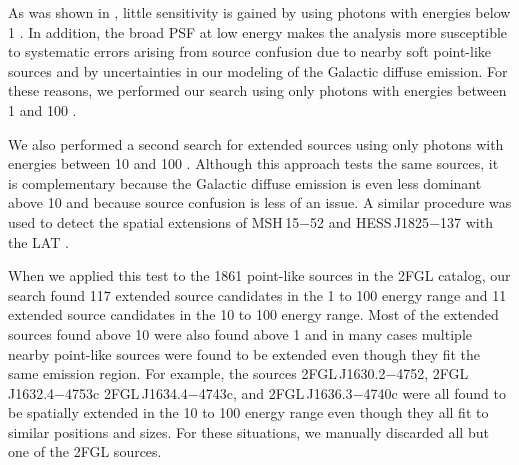 As was shown in , little sensitivity is gained by
using photons with energies below 1 \gev. In addition,
the broad PSF at low energy makes the analysis more susceptible to systematic
errors arising from source confusion due to nearby soft point-like sources
and by uncertainties in our modeling of the Galactic diffuse emission. 
For these reasons,
we performed our search using only photons with energies between 1 \gev
and 100 \gev.

We also performed a second search for extended sources using only
photons with energies between 10 \gev and 100 \gev.  Although this
approach tests the same sources, it is complementary because the Galactic
diffuse emission is even less dominant above 10 \gev and because source
confusion is less of an issue.  A similar procedure was used to detect
the spatial extensions of MSH\,15$-$52 and
HESS\,J1825$-$137 with the LAT \citep{abdo_2010a_detection-energetic,grondin_2011_detection-pulsar}.

When we applied this test to the 1861 point-like sources in the 2FGL catalog, our
search found 117 extended source candidates in the 1 \gev to 100 \gev
energy range and 11 extended source candidates in the 10 \gev to 100
\gev energy range. Most of the extended sources found above 10 \gev were
also found above 1 \gev and in many cases multiple nearby point-like
sources were found to be extended even though they fit the same emission region.
For example, the sources 2FGL\,J1630.2$-$4752, 2FGL\,J1632.4$-$4753c 2FGL\,J1634.4$-$4743c,
and 2FGL\,J1636.3$-$4740c were all found to be spatially extended in the
10 \gev to 100 \gev energy range even though they all fit to similar
positions and sizes.  For these situations, we manually discarded all
but one of the 2FGL sources.


